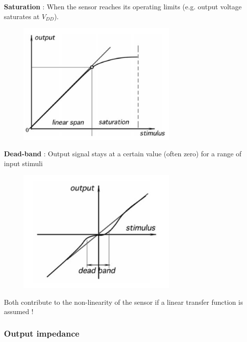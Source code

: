 \begin{minipage}[c]{.45\linewidth}	  
\textbf{Saturation} : When the sensor reaches
its operating limits (e.g. output voltage saturates at $V_{DD}$).
\begin{figure}[H]
    \centering
    \includegraphics[width = 0.7\textwidth]{L1/img/sat.PNG}
\end{figure}
\end{minipage} \hfill
\begin{minipage}[c]{.45\linewidth}
\textbf{Dead-band} : Output signal stays at a
certain value (often zero) for a range of input stimuli
\begin{figure}[H]
    \centering
    \includegraphics[width = 0.7\textwidth]{L1/img/dead-band.PNG}
\end{figure}
\end{minipage}
   
Both contribute to the non-linearity of the sensor if a linear transfer function is assumed !
   
\subsubsection{Output impedance}

